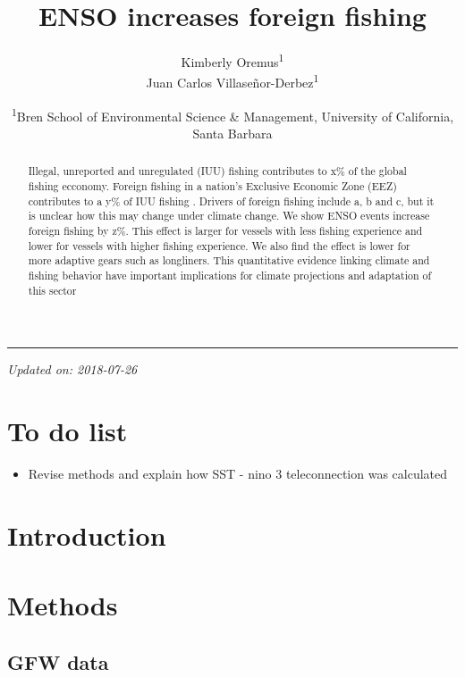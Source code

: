 \documentclass[]{article}
\title{ENSO increases foreign fishing}
\author{Kimberly Oremus\textsuperscript{1} \\ Juan Carlos Villaseñor-Derbez\textsuperscript{1}}
\date{\textsuperscript{1}Bren School of Environmental Science \& Management,
University of California, Santa Barbara}
\providecommand{\tightlist}{%
  \setlength{\itemsep}{0pt}\setlength{\parskip}{0pt}}
\begin{document}
\maketitle
\begin{abstract}
Illegal, unreported and unregulated (IUU) fishing contributes to x\% of
the global fishing ecconomy. Foreign fishing in a nation's Exclusive
Economic Zone (EEZ) contributes to a y\% of IUU fishing
\citep{cabral_2018}. Drivers of foreign fishing include a, b and c, but
it is unclear how this may change under climate change. We show ENSO
events increase foreign fishing by z\%. This effect is larger for
vessels with less fishing experience and lower for vessels with higher
fishing experience. We also find the effect is lower for more adaptive
gears such as longliners. This quantitative evidence linking climate and
fishing behavior have important implications for climate projections and
adaptation of this sector
\end{abstract}

{
\setcounter{tocdepth}{4}
\tableofcontents
}
\begin{center}\rule{0.5\linewidth}{\linethickness}\end{center}

\emph{Updated on: 2018-07-26}

\clearpage

\section{To do list}\label{to-do-list}

\begin{itemize}
\tightlist
\item
  Revise methods and explain how SST - nino 3 teleconnection was
  calculated
\end{itemize}

\clearpage

\section{Introduction}\label{introduction}

\section{Methods}\label{methods}

\subsection{GFW data}\label{gfw-data}
\end{document}
